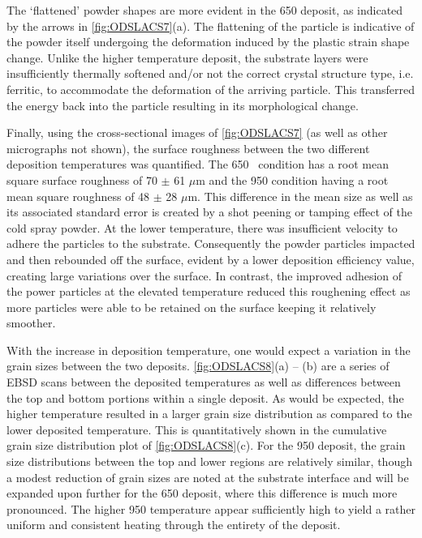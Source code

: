 	The ‘flattened’ powder shapes are more evident in the 650 \celsius{} deposit, as indicated by the arrows in \ref{fig:ODSLACS7}(a). The flattening of the particle is indicative of the powder itself undergoing the deformation induced by the plastic strain shape change. Unlike the higher temperature deposit, the substrate layers were insufficiently thermally softened and/or not the correct crystal structure type, i.e. ferritic, to accommodate the deformation of the arriving particle. This transferred the energy back into the particle resulting in its morphological change. 



	Finally, using the cross-sectional images of \ref{fig:ODSLACS7} (as well as other micrographs not shown), the surface roughness between the two different deposition temperatures was quantified. The 650 \celsius{} condition has a root mean square surface roughness of 70 $ \pm $  61  $ \mu $m and the 950 \celsius{} condition having a root mean square roughness of 48 $ \pm $  28  $ \mu $m. This difference in the mean size as well as its associated standard error is created by a shot peening or tamping effect of the cold spray powder. At the lower temperature, there was insufficient velocity to adhere the particles to the substrate. Consequently the powder particles impacted and then rebounded off the surface, evident by a lower deposition efficiency value, creating large variations over the surface. In contrast, the improved adhesion of the power particles at the elevated temperature reduced this roughening effect as more particles were able to be retained on the surface keeping it relatively smoother. 



	With the increase in deposition temperature, one would expect a variation in the grain sizes between the two deposits. \ref{fig:ODSLACS8}(a) – (b) are a series of EBSD scans between the deposited temperatures as well as differences between the top and bottom portions within a single deposit. As would be expected, the higher temperature resulted in a larger grain size distribution as compared to the lower deposited temperature. This is quantitatively shown in the cumulative grain size distribution plot of \ref{fig:ODSLACS8}(c). For the 950 \celsius{} deposit, the grain size distributions between the top and lower regions are relatively similar, though a modest reduction of grain sizes are noted at the substrate interface and will be expanded upon further for the 650 \celsius{} deposit, where this difference is much more pronounced. The higher 950 \celsius{} temperature appear sufficiently high to yield a rather uniform and consistent heating through the entirety of the deposit. 



